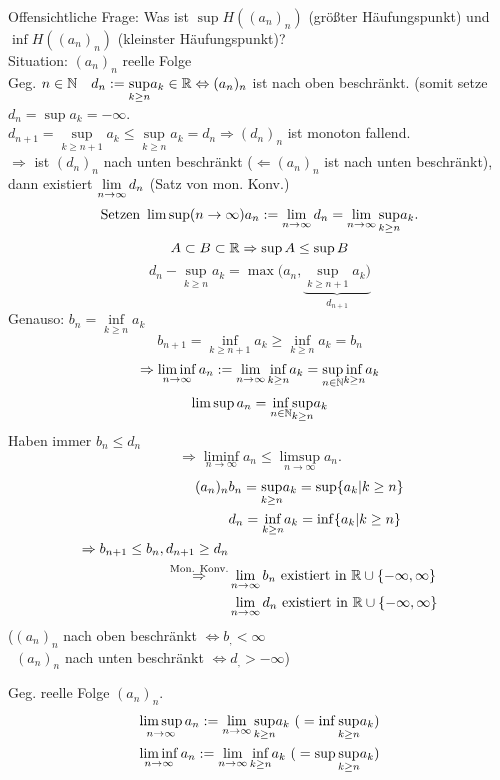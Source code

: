 Offensichtliche Frage: Was ist \( \sup H((a_n)_n) \) (größter Häufungspunkt) und \(  \inf H((a_n)_n) \) (kleinster Häufungspunkt)?\\
Situation: \((a_n)_n\) reelle Folge\\
Geg. \(n\in\mathbb{N} \quad d_n := \underset{k\geq n}{\sup}a_k \in \mathbb{R} \Leftrightarrow (a_n)_n\) ist nach oben beschränkt. (somit setze \(d_n = \sup a_k = -\infty \).\\
\( d_{n+1} = \underset{k\geq n+1}{\sup}a_k \leq \underset{k\geq n}{\sup}a_k = d_n \Longrightarrow (d_n)_n \) ist monoton fallend.\\
\( \Rightarrow \) ist \((d_n)_n\) nach unten beschränkt (\( \Leftarrow (a_n)_n \) ist nach unten beschränkt), dann existiert \( \lim\limits_{n\rightarrow\infty} d_n \) (Satz von mon. Konv.)\\
\[\text{Setzen } \limsup\limits(n\rightarrow\infty) a_n := \lim\limits_{n\rightarrow\infty} d_n = \lim\limits_{n\rightarrow\infty} \underset{k\geq n}{\sup} a_k. \]
\[ A\subset B\subset \mathbb{R} \Rightarrow \sup A \leq \sup B \]
\[ d_n - \underset{k\geq n}{\sup} a_k = \max(a_n, \underbrace{\underset{k\geq n+1}{\sup} a_k)}_{d_{n+1}} \]
Genauso: \(b_n = \underset{k\geq n}{\inf} a_k \)
\[ b_{n+1} = \underset{k\geq n+1}{\inf} a_k \geq \underset{k\geq n}{\inf} a_k = b_n \]
\[ \Rightarrow \liminf\limits_{n\rightarrow\infty} a_n := \lim\limits_{n\rightarrow\infty} \underset{k\geq n}{\inf} a_k = \underset{n\in\mathbb{N}}{\sup} \underset{k\geq n}{\inf} a_k \]
\[ \limsup a_n = \underset{n\in\mathbb{N}}{\inf} \underset{k\geq n}{\sup} a_k \]
Haben immer \(b_n \leq d_n\)
\[ \Rightarrow \liminf\limits_{n\rightarrow\infty} a_n \leq \limsup\limits_{n\rightarrow\infty} a_n. \]
\begin{align*}
	(a_n)_n &b_n = \underset{k\geq n}{\sup} a_k = \sup\{ a_k | k\geq n \}\\
	&d_n = \underset{k\geq n}{\inf} a_k = \inf\{ a_k | k\geq n \}\\
	\Rightarrow b_{n+1} \leq b_n, d_{n+1} \geq d_n\\
	\overset{\text{Mon. Konv.}}{\Rightarrow} &\lim\limits_{n\rightarrow\infty} b_n \text{ existiert in }\mathbb{R} \cup \{-\infty, \infty\}\\
	&\lim\limits_{n\rightarrow\infty} d_n \text{ existiert in }\mathbb{R} \cup \{-\infty, \infty\}
\end{align*}
(\((a_n)_n\) nach oben beschränkt \(\Leftrightarrow b_, < \infty \)\\\
\((a_n)_n\) nach unten beschränkt \(\Leftrightarrow d_, > -\infty \))
\begin{defi}
	Geg. reelle Folge \((a_n)_n\).\\
	\begin{align*}
		\limsup\limits_{n\rightarrow\infty} a_n := \lim\limits_{n\rightarrow\infty}\underset{k\geq n}{\sup} a_k \text{ (}=\inf\underset{k\geq n}{\sup}a_k\text{)}\\
		\liminf\limits_{n\rightarrow\infty} a_n := \lim\limits_{n\rightarrow\infty}\underset{k\geq n}{\inf} a_k \text{ (}=\sup\underset{k\geq n}{\sup}a_k\text{)}
	\end{align*}
\end{defi}
